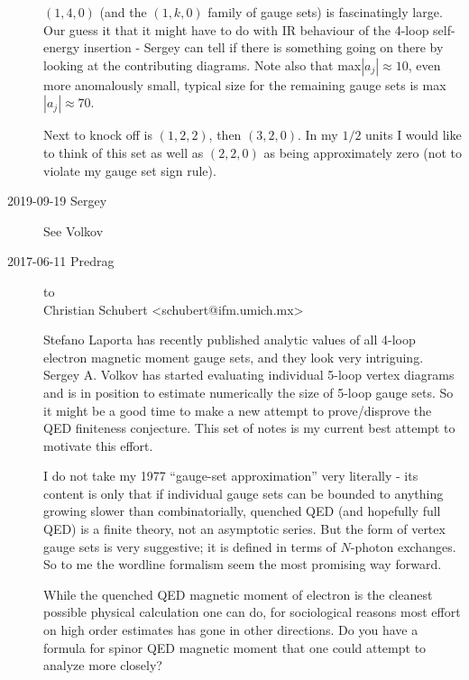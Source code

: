 \begin{description}
$(1,4,0)$ (and the $(1,k,0)$ family of gauge sets) is fascinatingly
large. Our guess it that it might have to do with IR behaviour of the
4-loop self-energy insertion - Sergey can tell if there is something
going on there by looking at the contributing diagrams.
Note also that max$|a_j|\approx 10$, even more anomalously small, typical
size for the remaining gauge sets is max$|a_j|\approx 70$.

Next to knock off is $(1,2,2)$, then $(3,2,0)$. In my $1/2$ units I would
like to think of this set as well as $(2,2,0)$ as being approximately zero
(not to violate my gauge set sign rule).

\item[2019-09-19 Sergey] See Volkov {\em }


\newpage
\item[2017-06-11 Predrag] to
\\
Christian Schubert <schubert@ifm.umich.mx>
%
%

Stefano Laporta  has recently published analytic values of all 4-loop
electron magnetic moment gauge sets, and they look very intriguing.
Sergey  A. Volkov has started evaluating individual 5-loop vertex
diagrams and is in position to estimate numerically the size of 5-loop
gauge sets. So it might be a good time to make a new attempt to prove/disprove
the QED finiteness conjecture. This set of notes is my current best attempt
to motivate this effort.

I do not take my 1977 ``gauge-set approximation'' very literally - its
content is only that if individual gauge sets can be bounded to anything
growing slower than combinatorially, quenched QED (and hopefully full
QED) is a finite theory, not an asymptotic series. But the form of vertex
gauge sets is very suggestive; it is defined in terms of $N$-photon
exchanges. So to me the wordline formalism seem the most promising way
forward.

While the quenched QED magnetic moment of electron is the cleanest
possible physical calculation one can do, for sociological reasons most
effort on high order estimates has gone in other directions. Do you have
a formula for spinor QED magnetic moment that one could attempt to
analyze more closely?


\end{description}
